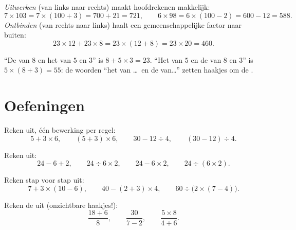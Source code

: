 \begin{example}\label{ex:g7:priorities:distributivity}
\emph{Uitwerken} (van links naar rechts) maakt hoofdrekenen makkelijk:
\[
7 \times 103 = 7 \times (100 + 3) = 700 + 21 = 721,
\qquad
6 \times 98 = 6 \times (100 - 2) = 600 - 12 = 588 .
\]
\emph{Ontbinden} (van rechts naar links) haalt een gemeenschappelijke factor naar
buiten:
\[
23 \times 12 + 23 \times 8 = 23 \times (12 + 8) = 23 \times 20 = 460 .
\]
\end{example}

\begin{example}\label{ex:g7:priorities:words}
``De  van $8$ en het  van $5$ en $3$'' is $8 + 5 \times 3 = 23$. ``Het
 van $5$ en de  van $8$ en $3$'' is $5 \times (8 + 3) = 55$: de
woorden ``het  van \dots\ en de  van\dots'' zetten haakjes om de .
\end{example}

\section{Oefeningen}

\begin{exercise}[$\star$]\label{exo:g7:priorities:1}
Reken uit, één bewerking per regel:
\[
5 + 3 \times 6, \qquad
(5 + 3) \times 6, \qquad
30 - 12 \div 4, \qquad
(30 - 12) \div 4 .
\]
\end{exercise}

\begin{exercise}[$\star$]\label{exo:g7:priorities:2}
Reken uit:
\[
24 - 6 + 2, \qquad
24 \div 6 \times 2, \qquad
24 - 6 \times 2, \qquad
24 \div (6 \times 2).
\]
\end{exercise}

\begin{exercise}[$\star$]\label{exo:g7:priorities:3}
Reken stap voor stap uit:
\[
7 + 3 \times (10 - 6), \qquad
40 - (2 + 3) \times 4, \qquad
60 \div \bigl(2 \times (7 - 4)\bigr).
\]
\end{exercise}

\begin{exercise}[$\star$]\label{exo:g7:priorities:4}
Reken de  uit (onzichtbare haakjes!):
\[
\frac{18 + 6}{8}, \qquad
\frac{30}{7 - 2}, \qquad
\frac{5 \times 8}{4 + 6} .
\]
\end{exercise}

